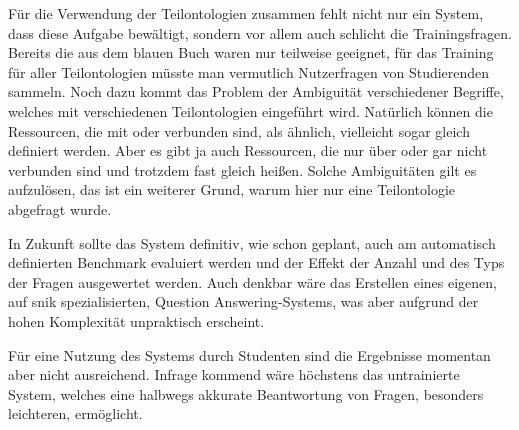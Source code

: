 Für die Verwendung der Teilontologien zusammen fehlt nicht nur ein System, dass diese Aufgabe bewältigt, sondern vor allem auch schlicht die Trainingsfragen.
Bereits die aus dem blauen Buch waren nur teilweise geeignet, für das Training für aller Teilontologien müsste man vermutlich Nutzerfragen von Studierenden sammeln.
Noch dazu kommt das Problem der Ambiguität verschiedener Begriffe, welches mit verschiedenen Teilontologien eingeführt wird.
Natürlich können die Ressourcen, die mit  oder  verbunden sind, als ähnlich, vielleicht sogar gleich definiert werden.
Aber es gibt ja auch Ressourcen, die nur über  oder gar nicht verbunden sind und trotzdem fast gleich heißen.
Solche Ambiguitäten gilt es aufzulösen, das ist ein weiterer Grund, warum hier nur eine Teilontologie abgefragt wurde.

In Zukunft sollte das System definitiv, wie schon geplant, auch am automatisch definierten Benchmark evaluiert werden und der Effekt der Anzahl und des Typs der Fragen ausgewertet werden.
Auch denkbar wäre das Erstellen eines eigenen, auf \ac{snik} spezialisierten, Question Answering-Systems, was aber aufgrund der hohen Komplexität unpraktisch erscheint.

Für eine Nutzung des Systems durch Studenten sind die Ergebnisse momentan aber nicht ausreichend.
Infrage kommend wäre höchstens das untrainierte System, welches eine halbwegs akkurate Beantwortung von Fragen, besonders leichteren, ermöglicht.
